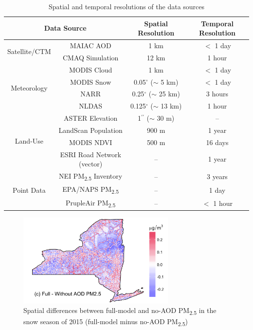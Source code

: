 \documentclass[11pt]{article}
\newcommand{\tsub}{\textsubscript}
\begin{document}
\newpage
\begin{table}[H]
    \centering
    \caption{Spatial and temporal resolutions of the data sources}
    \begin{tabular}{c|c|c|c}
        \hline
        \multicolumn{2}{c|}{Data Source} & Spatial Resolution & Temporal Resolution \\
        \hline
        \multirow{2}{*}{Satellite/CTM} & MAIAC AOD & 1 km & $<$ 1 day \\
        & CMAQ Simulation & 12 km & 1 hour \\
        \hline
        \multirow{4}{*}{Meteorology} & MODIS Cloud & 1 km & $<$ 1 day \\
        & MODIS Snow & 0.05$^{\circ}$ ($\sim$ 5 km) & $<$ 1 day \\
        & NARR & 0.25$^{\circ}$ ($\sim$ 25 km) & 3 hours\\
        & NLDAS & 0.125$^{\circ}$ ($\sim$ 13 km) & 1 hour \\
        \hline
        \multirow{4}{*}{Land-Use} & ASTER Elevation & 1$^{\prime\prime}$ ($\sim$ 30 m) & -- \\
        & LandScan Population & 900 m & 1 year \\
        & MODIS NDVI & 500 m & 16 days \\
        & ESRI Road Network (vector) & -- & 1 year \\
        \hline
        \multirow{3}{*}{Point Data} & NEI PM\tsub{2.5} Inventory  & -- & 3 years \\
        & EPA/NAPS PM\tsub{2.5} & -- & 1 day \\
        & PrupleAir PM\tsub{2.5} & -- & $<$ 1 hour \\
        \hline
    \end{tabular}
    \label{tab:res}
\end{table}

\begin{figure}[H]
    \centering
    \includegraphics[width=0.7\textwidth]{img/no_aod.png}
    \caption{Spatial differences between full-model and no-AOD PM\tsub{2.5} in the snow season of 2015 (full-model minus no-AOD PM\tsub{2.5})}
    \label{fig:noaod}
\end{figure}
\end{document}
